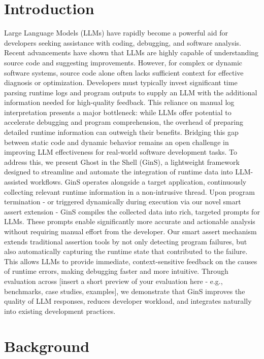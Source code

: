 \documentclass[sigconf,nonacm]{acmart}
\begin{document}
\section{Introduction}
Large Language Models (LLMs) have rapidly become a powerful aid for developers seeking assistance with coding, debugging, and software analysis. 
Recent advancements have shown that LLMs are highly capable of understanding source code and suggesting improvements. 
However, for complex or dynamic software systems, source code alone often lacks sufficient context for effective diagnosis or optimization. 
Developers must typically invest significant time parsing runtime logs and program outputs to supply an LLM with the additional information needed for high-quality feedback.
This reliance on manual log interpretation presents a major bottleneck: while LLMs offer potential to accelerate debugging and program comprehension, the overhead of preparing detailed runtime information can outweigh their benefits. 
Bridging this gap between static code and dynamic behavior remains an open challenge in improving LLM effectiveness for real-world software development tasks.
To address this, we present Ghost in the Shell (GinS), a lightweight framework designed to streamline and automate the integration of runtime data into LLM-assisted workflows. 
GinS operates alongside a target application, continuously collecting relevant runtime information in a non-intrusive thread. 
Upon program termination - or triggered dynamically during execution via our novel smart assert extension - GinS compiles the collected data into rich, targeted prompts for LLMs. 
These prompts enable significantly more accurate and actionable analysis without requiring manual effort from the developer.
Our smart assert mechanism extends traditional assertion tools by not only detecting program failures, but also automatically capturing the runtime state that contributed to the failure. This allows LLMs to provide immediate, context-sensitive feedback on the causes of runtime errors, making debugging faster and more intuitive.
Through evaluation across [insert a short preview of your evaluation here - e.g., benchmarks, case studies, examples], we demonstrate that GinS improves the quality of LLM responses, reduces developer workload, and integrates naturally into existing development practices.

\section{Background}
\end{document}
